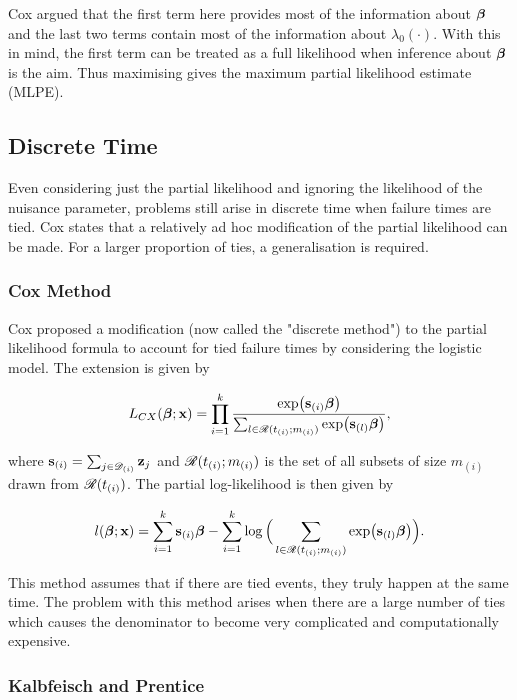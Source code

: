 Cox  argued that the first term here provides most of the information about $\boldsymbol{\beta}$ and the last two terms contain most of the information about $\lambda_0(\cdot)$. With this in mind, the first term can be treated as a full likelihood when inference about $\boldsymbol{\beta}$ is the aim. Thus maximising  gives the maximum partial likelihood estimate (MLPE).

\subsection{Discrete Time}\label{discrete-time}

Even considering just the partial likelihood and ignoring the likelihood of the nuisance parameter, problems still arise in discrete time when failure times are tied. Cox  states that a relatively ad hoc modification of the partial likelihood can be made. For a larger proportion of ties, a generalisation is required.

\subsubsection{Cox Method}

Cox  proposed a modification (now called the "discrete method") to the partial likelihood formula to account for tied failure times by considering the logistic model. The extension is given by

\begin{equation}
    L_{CX}(\boldsymbol{\beta};\textbf{x})=\prod_{i=1}^k\frac{\exp(\textbf{s}_{(i)}\boldsymbol{\beta})}{\sum_{l\in\mathscr{R}(t_{(i)};m_{(i)})}\exp(\textbf{s}_{(l)}\boldsymbol{\beta})},
\end{equation}

where $\textbf{s}_{(i)}=\sum_{j\in\mathscr{D}_{(i)}}\textbf{z}_j$ and $\mathscr{R}(t_{(i)};m_{(i)})$ is the set of all subsets of size $m_{(i)}$ drawn from $\mathscr{R}(t_{(i)})$. The partial log-likelihood is then given by

\begin{equation}
    l(\boldsymbol{\beta};\textbf{x})=\sum_{i=1}^k\textbf{s}_{(i)}\boldsymbol{\beta}-\sum_{i=1}^k\log\Big(\sum_{l\in\mathscr{R}(t_{(i)};m_{(i)})}\exp(\textbf{s}_{(l)}\boldsymbol{\beta})\Big).
\end{equation}

This method assumes that if there are tied events, they truly happen at the same time. The problem with this method arises when there are a large number of ties which causes the denominator to become very complicated and computationally expensive.

\subsubsection{Kalbfeisch and Prentice}

